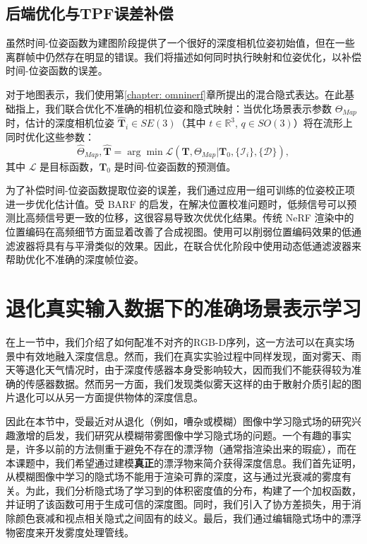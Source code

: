 \subsection{后端优化与TPF误差补偿}
虽然时间-位姿函数为建图阶段提供了一个很好的深度相机位姿初始值，但在一些离群帧中仍然存在明显的错误。我们将描述如何同时执行映射和位姿优化，以补偿时间-位姿函数的误差。

对于地图表示，我们使用第\ref{chapter: omninerf}章所提出的混合隐式表达。在此基础指上，我们联合优化不准确的相机位姿和隐式映射：当优化场景表示参数 $\Theta_{Map}$ 时，估计的深度相机位姿 $\hat{\mathbf{T}}_i \in SE(3)$（其中 $t \in \mathbb{R}^3$, $q \in SO(3)$）将在流形上同时优化这些参数：
\begin{equation}
    \hat{\Theta}_{Map},\hat{\mathbf{T}} = \arg\min\mathcal{L}(\mathbf{T}, \Theta_{Map} | \mathbf{T}_0, \{\mathcal{I}_i\}, \{\mathcal{D}\}),
\end{equation}
其中 $\mathcal{L}$ 是目标函数，$\mathbf{T}_0$ 是时间-位姿函数的预测值。

为了补偿时间-位姿函数提取位姿的误差，我们通过应用一组可训练的位姿校正项进一步优化估计值。受 BARF\cite{lin_barf_2021} 的启发，在解决位置校准问题时，低频信号可以预测比高频信号更一致的位移，这很容易导致次优优化结果。传统 NeRF 渲染中的位置编码在高频细节方面显着改善了合成视图。使用可以削弱位置编码效果的低通滤波器将具有与平滑类似的效果。因此，在联合优化阶段中使用动态低通滤波器来帮助优化不准确的深度帧位姿。

\newpage
\section{退化真实输入数据下的准确场景表示学习}
在上一节中，我们介绍了如何配准不对齐的RGB-D序列，这一方法可以在真实场景中有效地融入深度信息。然而，我们在真实实验过程中同样发现，面对雾天、雨天等退化天气情况时，由于深度传感器本身受影响较大，因而我们不能获得较为准确的传感器数据。然而另一方面，我们发现类似雾天这样的由于散射介质引起的图片退化可以从另一方面提供物体的深度信息。

因此在本节中，受最近对从退化（例如，嘈杂或模糊）图像中学习隐式场的研究兴趣激增的启发，我们研究从模糊带雾图像中学习隐式场的问题。一个有趣的事实是，许多以前的方法侧重于避免不存在的漂浮物（通常指渲染出来的瑕疵），而在本课题中，我们希望通过建模\textbf{真正}的漂浮物来简介获得深度信息。我们首先证明，从模糊图像中学习的隐式场不能用于渲染可靠的深度，这与通过光衰减的雾度有关。为此，我们分析隐式场了学习到的体积密度值的分布，构建了一个加权函数，并证明了该函数可用于生成可信的深度图。同时，我们引入了协方差损失，用于消除颜色衰减和视点相关隐式之间固有的歧义。最后，我们通过编辑隐式场中的漂浮物密度来开发雾度处理管线。

